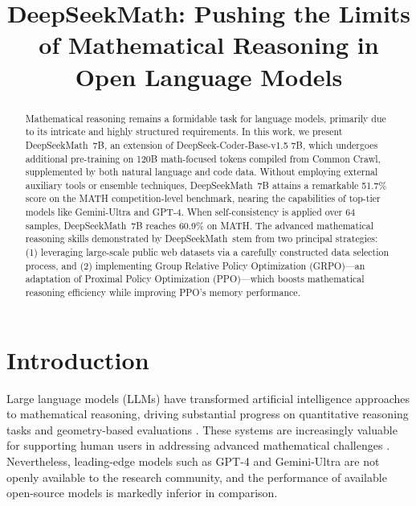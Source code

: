 \title{DeepSeekMath: Pushing the Limits of Mathematical Reasoning in Open Language Models}

\begin{abstract}
Mathematical reasoning remains a formidable task for language models, primarily due to its intricate and highly structured requirements. In this work, we present DeepSeekMath~7B, an extension of DeepSeek-Coder-Base-v1.5 7B, which undergoes additional pre-training on 120B math-focused tokens compiled from Common Crawl, supplemented by both natural language and code data. Without employing external auxiliary tools or ensemble techniques, DeepSeekMath~7B attains a remarkable 51.7\% score on the MATH competition-level benchmark, nearing the capabilities of top-tier models like Gemini-Ultra and GPT-4. When self-consistency is applied over 64 samples, DeepSeekMath~7B reaches 60.9\% on MATH. The advanced mathematical reasoning skills demonstrated by DeepSeekMath~stem from two principal strategies: (1) leveraging large-scale public web datasets via a carefully constructed data selection process, and (2) implementing Group Relative Policy Optimization (GRPO)—an adaptation of Proximal Policy Optimization (PPO)—which boosts mathematical reasoning efficiency while improving PPO’s memory performance.
\end{abstract}

\section{Introduction}

Large language models (LLMs) have transformed artificial intelligence approaches to mathematical reasoning, driving substantial progress on quantitative reasoning tasks \citep{MATH} and geometry-based evaluations \citep{trinh2024solving}. These systems are increasingly valuable for supporting human users in addressing advanced mathematical challenges \citep{tao}. Nevertheless, leading-edge models such as GPT-4 \citep{gpt4} and Gemini-Ultra \citep{gemini} are not openly available to the research community, and the performance of available open-source models is markedly inferior in comparison.

